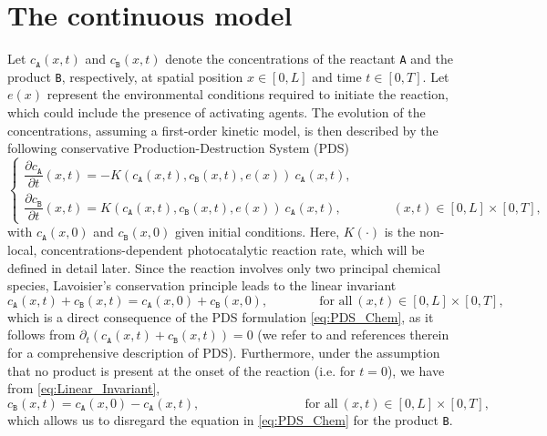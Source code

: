 \documentclass[a4paper, UKenglish, numberwithinsect, thm-restate]{tgdk-v2021}
\begin{document}


\section{The continuous model}\label{sec:Continuous_Model}
Let $c_\texttt{A}(x,t)$ and $c_\texttt{B}(x,t)$ denote the concentrations of the reactant \texttt{A} and the product \texttt{B}, respectively, at spatial position $x \in [0,L]$ and time $t \in [0,T].$ Let $e(x)$ represent the environmental conditions required to initiate the reaction, which could include the presence of activating agents. The evolution of the concentrations, assuming a first-order kinetic model, is then described  by the following conservative Production-Destruction System (PDS)
\begin{equation}\label{eq:PDS_Chem}
    \begin{cases}
        \dfrac{\partial c_\texttt{A}}{\partial t}(x,t)=-K\!\left(c_\texttt{A}(x,t),c_\texttt{B}(x,t),e(x)\right) \ c_\texttt{A}(x,t), \\[0.20cm]
        \dfrac{\partial c_\texttt{B}}{\partial t}(x,t)=K\!\left(c_\texttt{A}(x,t),c_\texttt{B}(x,t),e(x)\right) \ c_\texttt{A}(x,t), \qquad\qquad (x,t)\in [0,L]\times [0,T],
    \end{cases}
\end{equation}
with $c_\texttt{A}(x,0)$ and $c_{\texttt{B}}(x,0)$ given initial conditions. Here, $K(\cdot)$ is the non-local, concentrations-dependent photocatalytic reaction rate,  which will be defined in detail later. Since the reaction involves only two principal chemical species, Lavoisier's conservation principle leads to the linear invariant 
\begin{equation}\label{eq:Linear_Invariant}
    c_\texttt{A}(x,t)+c_\texttt{B}(x,t)=c_\texttt{A}(x,0)+c_\texttt{B}(x,0), \qquad\qquad \text{for all} \ (x,t)\in [0,L]\times [0,T],
\end{equation}
which is a direct consequence of the PDS formulation \eqref{eq:PDS_Chem}, as it follows from $\partial_t\!\left(c_\texttt{A}(x,t)+c_\texttt{B}(x,t)\right)=0$ (we refer to \cite{anderHeiden1982,PDS} and references therein for a comprehensive description of PDS). Furthermore, under the assumption that no product is present at the onset of the reaction (i.e. for $t=0$), we have from \eqref{eq:Linear_Invariant},
\begin{equation}\label{eq: c_B}
     c_\texttt{B}(x,t)=c_\texttt{A}(x,0)-c_\texttt{A}(x,t), \qquad \qquad \qquad \qquad \  \text{for all} \ (x,t)\in [0,L]\times [0,T],
\end{equation}
which allows us to disregard the equation in \eqref{eq:PDS_Chem} for the product \texttt{B}.
\end{document}
